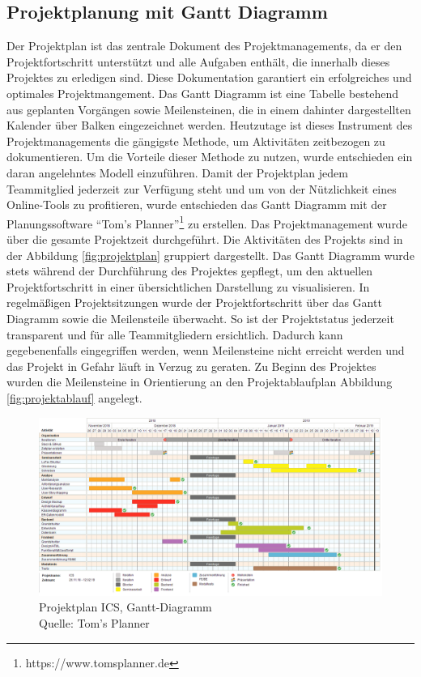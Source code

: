 	\subsection{Projektplanung mit Gantt Diagramm}
	Der Projektplan ist das zentrale Dokument des Projektmanagements, da er den Projektfortschritt unterstützt und alle Aufgaben enthält, die innerhalb dieses Projektes zu erledigen sind. Diese Dokumentation garantiert ein erfolgreiches und optimales Projektmangement. Das Gantt Diagramm ist eine Tabelle bestehend aus geplanten Vorgängen sowie Meilensteinen, die in einem dahinter dargestellten Kalender über Balken eingezeichnet werden\autocite[Vgl.][S. 107]{projektmanagement}. Heutzutage ist dieses Instrument des Projektmanagements die gängigste Methode, um Aktivitäten zeitbezogen zu dokumentieren. Um die Vorteile dieser Methode zu nutzen, wurde entschieden ein daran angelehntes Modell einzuführen. Damit der Projektplan jedem Teammitglied jederzeit zur Verfügung steht und um von der Nützlichkeit eines Online-Tools zu profitieren, wurde entschieden das Gantt Diagramm mit der Planungssoftware \enquote{Tom's Planner}\footnote{https://www.tomsplanner.de} zu erstellen.
	Das Projektmanagement wurde über die gesamte Projektzeit durchgeführt. Die Aktivitäten des Projekts sind in der Abbildung \vref{fig:projektplan} gruppiert dargestellt. Das Gantt Diagramm wurde stets während der Durchführung des Projektes gepflegt, um den aktuellen Projektfortschritt in einer übersichtlichen Darstellung zu visualisieren. In regelmäßigen Projektsitzungen wurde der Projektfortschritt über das Gantt Diagramm sowie die Meilensteile überwacht. So ist der Projektstatus jederzeit transparent und für alle Teammitgliedern ersichtlich. Dadurch kann gegebenenfalls eingegriffen werden, wenn Meilensteine nicht erreicht werden und das Projekt in Gefahr läuft in Verzug zu geraten.  
	 Zu Beginn des Projektes wurden die Meilensteine in Orientierung an den Projektablaufplan Abbildung \vref{fig:projektablauf} angelegt. 
	\begin{figure}[H]
		\centering 
		\includegraphics[width=14cm]{img/projektplan.png}
		\captionsetup{format=hang}
		\caption[Projektplan]{\label{fig:projektplan} Projektplan ICS, Gantt-Diagramm \\ Quelle: Tom's Planner}
	\end{figure}
